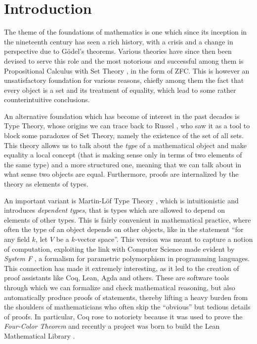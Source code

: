 \chapter*{Introduction}

The theme of the foundations of mathematics is one which since its inception in
the nineteenth century has seen a rich history, with a crisis and a change in
perspective due to G{\"o}del's theorems. Various theories have since then been
devised to serve this role and the most notorious and successful among them is
Propositional Calculus with
Set Theory \cite{Jec13}, in the form of ZFC. This is however an
unsatisfactory foundation
for various reasons, chiefly among them the fact that every object is a set and
its treatment of equality, which lead to some rather counterintuitive
conclusions.

An alternative foundation which has become of interest in the past decades is
Type Theory, whose origins we can trace back to Russel \cite{Rus08,RW97},
who saw it as a tool to
block some paradoxes of Set Theory,
namely the existence of the set of all sets. This theory allows us to talk about
the \emph{type} of a mathematical
object and make equality a local concept (that is making sense only in terms of
two elements of the same type) and a more structured one, meaning that we can
talk about in what sense two objects are equal. Furthermore, proofs are
internalized by the theory as elements of types.

An important variant is Martin-L{\"o}f Type Theory \cite{ML84}, which is
intuitionistic and introduces \emph{dependent types}, that is types which are
allowed to depend on elements of other types. This is fairly convenient in
mathematical practice, where often the type of an object depends on other
objects, like in the statement ``for any field
$k$, let $V$ be a $k$-vector space''. This version was meant
to capture a notion of computation, exploiting the link with Computer Science
made evident by \emph{System F} \cite{Gir89}, a formalism for parametric
polymorphism in programming languages. This connection
has made it extremely interesting, as it led to the
creation of proof assistants like Coq, Lean, Agda and others. These are software
tools through which we can formalize and check mathematical reasoning, but also
automatically produce proofs of statements, thereby lifting a heavy burden from
the shoulders of mathematicians who often skip the ``obvious'' but tedious
details of proofs. In particular, Coq rose to notoriety because it was used to
prove the \emph{Four-Color Theorem} \cite{Gon08} and recently a project
was born to build the Lean Mathematical Library \cite{mat20}.

